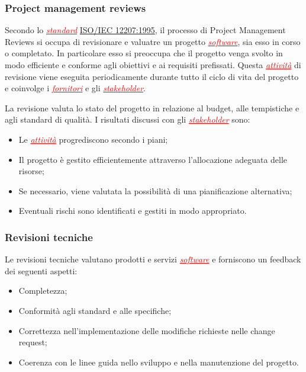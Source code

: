 \subsubsection{Project management reviews}
Secondo lo \textcolor{red}{\uline{\textit{standard}}} \href{https://www.math.unipd.it/~tullio/IS-1/2009/Approfondimenti/ISO_12207-1995.pdf}{ISO/IEC 12207:1995},
il processo di Project Management Reviews si occupa di revisionare e valuatre un progetto \textcolor{red}{\uline{\textit{software}}}, sia esso
in corso o completato. In particolare esso si preoccupa che il progetto venga svolto in modo efficiente e conforme agli obiettivi e ai requisiti 
prefissati. Questa \textcolor{red}{\uline{\textit{attività}}} di revisione viene eseguita periodicamente durante tutto il ciclo di vita del progetto e
coinvolge i \textcolor{red}{\uline{\textit{fornitori}}} e gli \textcolor{red}{\uline{\textit{stakeholder}}}.

La revisione valuta lo stato del progetto in relazione al budget, alle tempistiche e agli standard di qualità. I risultati discussi con gli
\textcolor{red}{\uline{\textit{stakeholder}}} sono:
\begin{itemize}
    \item Le \textcolor{red}{\uline{\textit{attività}}} progrediscono secondo i piani;
    \item Il progetto è gestito efficientemente attraverso l'allocazione adeguata delle risorse;
    \item Se necessario, viene valutata la possibilità di una pianificazione alternativa;
    \item Eventuali rischi sono identificati e gestiti in modo appropriato.
\end{itemize}

\subsubsection{Revisioni tecniche}
Le revisioni tecniche valutano prodotti e servizi \textcolor{red}{\uline{\textit{software}}} e forniscono un feedback dei seguenti aspetti:
\begin{itemize}
    \item Completezza;
    \item Conformità agli standard e alle specifiche;
    \item Correttezza nell'implementazione delle modifiche richieste nelle change request;
    \item Coerenza con le linee guida nello sviluppo e nella manutenzione del progetto.
\end{itemize}

